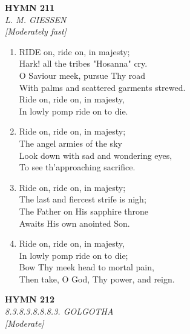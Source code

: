 \documentclass[11pt,a4paper]{article}
\begin{document}
\newpage
\begin{center}
    {\Large \textbf{HYMN 211}}
    \\
    \textit{L. M. GIESSEN}
    \\
    \textit{\small [Moderately fast]}
\end{center}
\vspace{1em}

\begin{enumerate}
    \item RIDE on, ride on, in majesty; \\
        Hark! all the tribes "Hosanna" cry. \\
        O Saviour meek, pursue Thy road \\
        With palms and scattered garments strewed. \\
            Ride on, ride on, in majesty, \\
            In lowly pomp ride on to die.

    \item Ride on, ride on, in majesty; \\
        The angel armies of the sky \\
        Look down with sad and wondering eyes, \\
        To see th'approaching sacrifice.

    \item Ride on, ride on, in majesty; \\
        The last and fiercest strife is nigh; \\
        The Father on His sapphire throne \\
        Awaits His own anointed Son.

    \item Ride on, ride on, in majesty, \\
        In lowly pomp ride on to die; \\
        Bow Thy meek head to mortal pain, \\
        Then take, O God, Thy power, and reign.

\end{enumerate}

\newpage
\begin{center}
    {\Large \textbf{HYMN 212}}
    \\
    \textit{8.3.8.3.8.8.8.3. GOLGOTHA}
    \\
    \textit{\small [Moderate]}
\end{center}
\vspace{1em}
\end{document}
